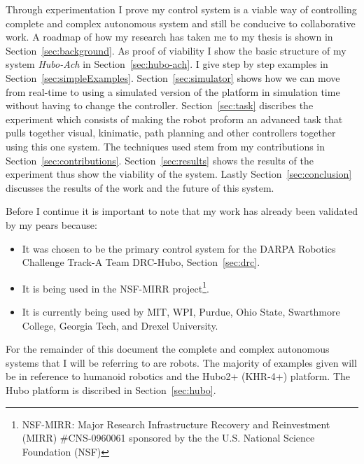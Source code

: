 Through experimentation I prove my control system is a viable way of controlling complete and complex autonomous system and still be conducive to collaborative work.  
A roadmap of how my research has taken me to my thesis is shown in Section~\ref{sec:background}.
As proof of viability I show the basic structure of my system \textit{Hubo-Ach} in Section~\ref{sec:hubo-ach}\cite{lofaroRAM2013}.  
I give step by step examples in Section~\ref{sec:simpleExamples}.
Section~\ref{sec:simulator} shows how we can move from real-time to using a simulated version of the platform in simulation time without having to change the controller.
Section~\ref{sec:task} discribes the experiment which consists of making the robot proform an advanced task that pulls together visual, kinimatic, path planning and other controllers together using this one system.
The techniques used stem from my contributions in Section~\ref{sec:contributions}.
Section~\ref{sec:results} shows the results of the experiment thus show the viability of the system.
Lastly Section~\ref{sec:conclusion} discusses the results of the work and the future of this system.

Before I continue it is important to note that my work has already been validated by my pears because:
\begin{itemize}
\item It was chosen to be the primary control system for the DARPA Robotics Challenge Track-A Team DRC-Hubo, Section~\ref{sec:drc}.
\item It is being used in the NSF-MIRR project\footnote{NSF-MIRR: Major Research Infrastructure Recovery and Reinvestment (MIRR) #CNS-0960061 sponsored by the the U.S. National Science Foundation (NSF)}.
\item It is currently being used by MIT, WPI, Purdue, Ohio State, Swarthmore College, Georgia Tech, and Drexel University.
\end{itemize}

For the remainder of this document the complete and complex autonomous systems that I will be referring to are robots.
The majority of examples given will be in reference to humanoid robotics and the Hubo2+ (KHR-4+) platform.
The Hubo platform is discribed in Section~\ref{sec:hubo}.









